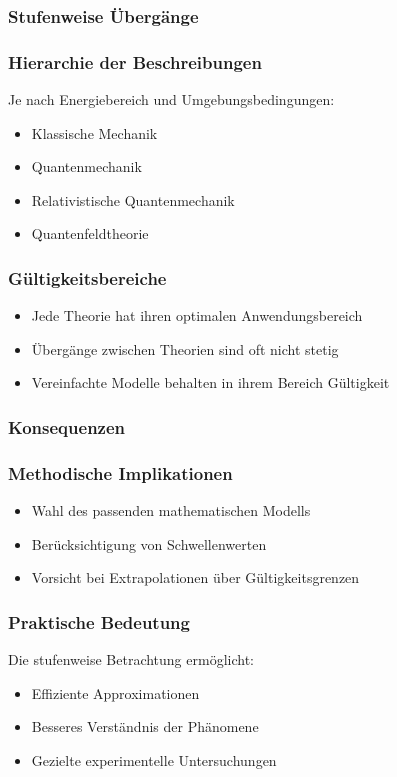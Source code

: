 \documentclass[12pt,a4paper]{article}
\begin{document}
	\subsubsection{Stufenweise Übergänge}
	
	\subsubsection{Hierarchie der Beschreibungen}
	Je nach Energiebereich und Umgebungsbedingungen:
	\begin{itemize}
		\item Klassische Mechanik
		\item Quantenmechanik
		\item Relativistische Quantenmechanik
		\item Quantenfeldtheorie
	\end{itemize}
	
	\subsubsection{Gültigkeitsbereiche}
	\begin{itemize}
		\item Jede Theorie hat ihren optimalen Anwendungsbereich
		\item Übergänge zwischen Theorien sind oft nicht stetig
		\item Vereinfachte Modelle behalten in ihrem Bereich Gültigkeit
	\end{itemize}
	
	\subsubsection{Konsequenzen}
	
	\subsubsection{Methodische Implikationen}
	\begin{itemize}
		\item Wahl des passenden mathematischen Modells
		\item Berücksichtigung von Schwellenwerten
		\item Vorsicht bei Extrapolationen über Gültigkeitsgrenzen
	\end{itemize}
	
	\subsubsection{Praktische Bedeutung}
	Die stufenweise Betrachtung ermöglicht:
	\begin{itemize}
		\item Effiziente Approximationen
		\item Besseres Verständnis der Phänomene
		\item Gezielte experimentelle Untersuchungen
	\end{itemize}
	
\end{document}
